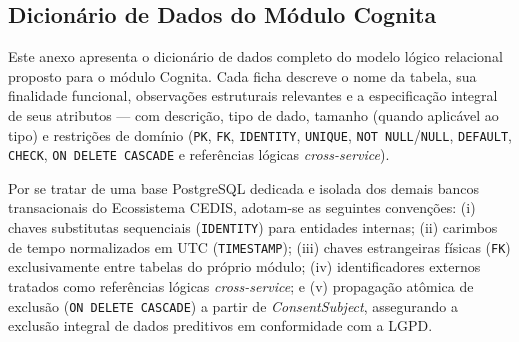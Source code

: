 
\begin{anexosenv}

\partanexos

\chapter{Dicionário de Dados do Módulo Cognita}
\label{an:dicionario-dados}

\raggedbottom

Este anexo apresenta o dicionário de dados completo do modelo lógico relacional proposto para o módulo Cognita. Cada ficha descreve o nome da tabela, sua finalidade funcional, observações estruturais relevantes e a especificação integral de seus atributos --- com descrição, tipo de dado, tamanho (quando aplicável ao tipo) e restrições de domínio (\texttt{PK}, \texttt{FK}, \texttt{IDENTITY}, \texttt{UNIQUE}, \texttt{NOT NULL}/\texttt{NULL}, \texttt{DEFAULT}, \texttt{CHECK}, \texttt{ON DELETE CASCADE} e referências lógicas \textit{cross-service}).

Por se tratar de uma base PostgreSQL dedicada e isolada dos demais bancos transacionais do Ecossistema CEDIS, adotam-se as seguintes convenções: (i) chaves substitutas sequenciais (\texttt{IDENTITY}) para entidades internas; (ii) carimbos de tempo normalizados em UTC (\texttt{TIMESTAMP}); (iii) chaves estrangeiras físicas (\texttt{FK}) exclusivamente entre tabelas do próprio módulo; (iv) identificadores externos tratados como referências lógicas \textit{cross-service}; e (v) propagação atômica de exclusão (\texttt{ON DELETE CASCADE}) a partir de \textit{ConsentSubject}, assegurando a exclusão integral de dados preditivos em conformidade com a LGPD.

{\footnotesize
\setlength{\tabcolsep}{4pt}

}
\end{anexosenv}
